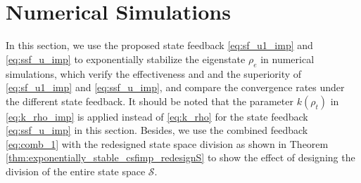 \documentclass[]{elsarticle}
\begin{document}
\section{Numerical Simulations}\label{Sec:NumSim}
In this section, we use the proposed state feedback \eqref{eq:sf_u1_imp} and \eqref{eq:ssf_u_imp} to exponentially stabilize the eigenstate $\rho_e$ in numerical simulations, which verify the effectiveness and and the superiority of \eqref{eq:sf_u1_imp} and \eqref{eq:ssf_u_imp}, and compare the convergence rates under the different state feedback. It should be noted that the parameter $k\left(\rho_{t}\right)$ in \eqref{eq:k_rho_imp} is applied instead of \eqref{eq:k_rho} for the  state feedback \eqref{eq:ssf_u_imp} in this section. Besides, we use the combined feedback \eqref{eq:comb_1} with the redesigned state space division as shown in Theorem \ref{thm:exponentially_stable_csfimp_redesignS} to show the effect of designing the division of the entire state space $\mathcal{S}$.
\end{document}
